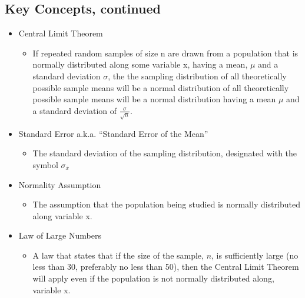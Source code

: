 \documentclass[]{article}
\begin{document}
\subsection{Key Concepts, continued}\label{key-concepts-continued}

\begin{itemize}
\itemsep1pt\parskip0pt
\item
  Central Limit Theorem

  \begin{itemize}
  \itemsep1pt\parskip0pt
  \item
    If repeated random samples of size n are drawn from a population
    that is normally distributed along some variable x, having a mean,
    $\mu$ and a standard deviation $\sigma$, the the sampling
    distribution of all theoretically possible sample means will be a
    normal distribution of all theoretically possible sample means will
    be a normal distribution having a mean $\mu$ and a standard
    deviation of $\frac{\sigma}{\sqrt{n}}$.
  \end{itemize}
\item
  Standard Error a.k.a. ``Standard Error of the Mean''

  \begin{itemize}
  \itemsep1pt\parskip0pt
  \item
    The standard deviation of the sampling distribution, designated with
    the symbol $\sigma_{\bar{x}}$
  \end{itemize}
\item
  Normality Assumption

  \begin{itemize}
  \itemsep1pt\parskip0pt
  \item
    The assumption that the population being studied is normally
    distributed along variable x.
  \end{itemize}
\item
  Law of Large Numbers

  \begin{itemize}
  \itemsep1pt\parskip0pt
  \item
    A law that states that if the size of the sample, $n$, is
    sufficiently large (no less than 30, preferably no less than 50),
    then the Central Limit Theorem will apply even if the population is
    not normally distributed along, variable x.
  \end{itemize}
\end{itemize}
\end{document}

